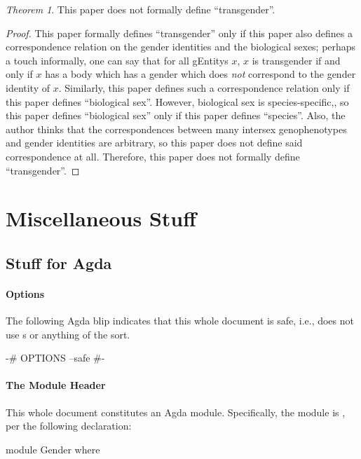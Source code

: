 \documentclass{article}
\theoremstyle{remark}
\newtheorem{theorem}{Theorem}
\begin{document}
\begin{theorem}
  This paper does not formally define ``transgender''.
\end{theorem}
\begin{proof}
  This paper formally defines ``transgender'' only if this paper also defines a correspondence relation on the gender identities and the biological sexes; perhaps a touch informally, one can say that for all \glspl{gEntity} \(x\), \(x\) is transgender if and only if \(x\) has a body which has a gender which does \emph{not} correspond to the gender identity of \(x\).  Similarly, this paper defines such a correspondence relation only if this paper defines ``biological sex''.  However, biological sex is species-specific,\cite{citationNeeded}, so this paper defines ``biological sex'' only if this paper defines ``species''.  Also, the author thinks that the correspondences between many intersex genophenotypes and gender identities are arbitrary, so this paper does not define said correspondence at all.  Therefore, this paper does not formally define ``transgender''.
\end{proof}

\section{Miscellaneous Stuff}

\subsection{Stuff for Agda}

\paragraph{Options}
The following Agda blip indicates that this whole document is safe, i.e., does not use s or anything of the sort.

\begin{code}
{-# OPTIONS --safe #-}
\end{code}

\paragraph{The Module Header}
This whole document constitutes an Agda module.  Specifically, the module is , per the following declaration:

\begin{code}
module Gender where
\end{code}
\end{document}
